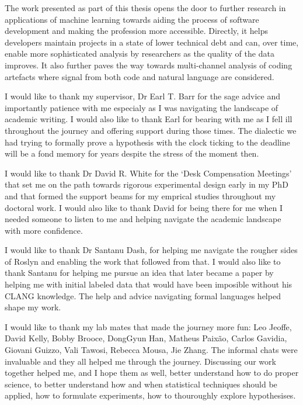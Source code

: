 \begin{impactstatement}
The work presented as part of this thesis opens the door to further research in applications of machine learning towards aiding the process of software development and making the profession more accessible. Directly, it helps developers maintain projects in a state of lower technical debt and can, over time, enable more sophisticated analysis by researchers as the quality of the data improves. It also further paves the way towards multi-channel analysis of coding artefacts where signal from both code and natural language are considered. 
\end{impactstatement}

\begin{acknowledgements}
I would like to thank my supervisor, Dr Earl T. Barr for the sage advice and
importantly patience with me especialy as I was navigating the landscape of
academic writing. I would also like to thank Earl for bearing with me as I fell
ill throughout the journey and offering support during those times. The
dialectic we had trying to formally prove a hypothesis with the clock ticking to
the deadline will be a fond memory for years despite the stress of the moment
then.

I would like to thank Dr David R. White for the `Desk Compensation Meetings'
that set me on the path towards rigorous experimental design early in my PhD and
that formed the support beams for my emprical studies throughout my doctoral
work. I would also like to thank David for being there for me when I needed
someone to listen to me and helping navigate the academic landscape with more
confidence.

I would like to thank Dr Santanu Dash, for helping me navigate the rougher sides
of Roslyn and enabling the work that followed from that. I would also like to
thank Santanu for helping me pursue an idea that later became a paper by helping
me with initial labeled data that would have been imposible without his CLANG
knowledge. The help and advice navigating formal languages helped shape my work.

I would like to thank my lab mates that made the journey more fun: Leo Jeoffe,
David Kelly, Bobby Brooce, DongGyun Han, Matheus Paix\~ao, Carlos Gavidia,
Giovani Guizzo, Vali Tawosi, Rebecca Mousa, Jie Zhang. The informal chats were
invaluable and they all helped me through the journey. Discussing our work
together helped me, and I hope them as well, better understand how to do proper
science, to better understand how and when statistical techniques should be
applied, how to formulate experiments, how to thouroughly explore hypothesises.


\end{acknowledgements}
